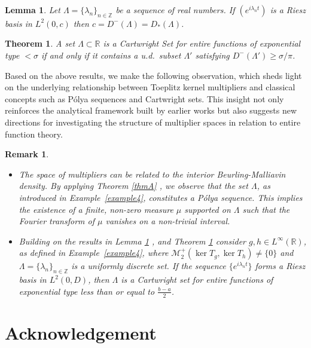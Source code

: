 \documentclass[12pt,a4paper]{amsart}
\newtheorem{theorem}{Theorem}[section]
\newtheorem{lemma}{Lemma}[section]
\newtheorem{remark}{Remark}
\begin{document}
\begin{lemma}\label{lemma4}\cite{Mitkovski2011}
	Let $\Lambda = \{\lambda_n\}_{n \in \mathbb Z}$ be a sequence of real numbers. If $(e^{i\lambda_n t})$  is a Riesz
	basis in $L^2(0,c)$ then $c=D^-(\Lambda)=D_*(\Lambda)$.
\end{lemma}
\begin{theorem}\label{thmB}\cite{natalia2016}
	A set $\Lambda \subset \mathbb{R}$ is a Cartwright Set for entire functions of exponential type $<\sigma$ if and only if it contains a u.d.\ subset $\Lambda '$ satisfying $D^{-}(\Lambda ') \geq \sigma/\pi$.
\end{theorem}
Based on the above results, we make the following observation, which sheds light on the underlying relationship between Toeplitz kernel multipliers and classical concepts such as P\'olya sequences and Cartwright  sets. This insight not only reinforces the analytical framework built by earlier works but also suggests new directions for investigating the structure of multiplier spaces in relation to entire function theory.
\begin{remark}
\begin{itemize}
	
\smallskip	
	
\item[(a)] The space of multipliers can be related to the interior Beurling-Malliavin density. By applying Theorem \ref{thmA} \cite{Mitkovski2010}, we observe that the set \( \Lambda \), as introduced in Example~\ref{example4}, constitutes a P\'olya sequence. This implies the existence of a finite, non-zero measure \( \mu \) supported on \( \Lambda \) such that the Fourier transform of \( \mu \) vanishes on a non-trivial interval.

\item[(b)] Building on the results in Lemma \ref{lemma4} \cite{Mitkovski2011}, and Theorem \ref{thmB} \cite{natalia2016} consider \( g, h \in L^\infty(\mathbb{R}) \), as defined in Example~\ref{example4}, where \( \mathcal{M}_2^+(\ker T_g, \ker T_h) \neq \{0\} \) and \( \Lambda = \{\lambda_n\}_{n \in \mathbb{Z}} \) is a uniformly discrete set. If the sequence \( \{ e^{i \lambda_n t} \} \) forms a Riesz basis in \( L^2(0, D) \), then \( \Lambda \) is a Cartwright set for entire functions of exponential type less than or equal to \( \frac{b-a}{2} \).
\end{itemize}
\end{remark}
\section*{Acknowledgement}
\end{document}
